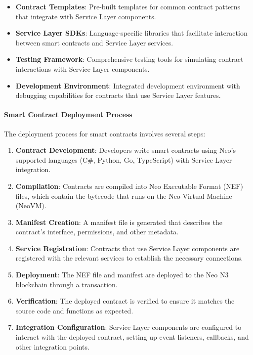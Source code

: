 \begin{itemize}
    \item \textbf{Contract Templates}: Pre-built templates for common contract patterns that integrate with Service Layer components.
    
    \item \textbf{Service Layer SDKs}: Language-specific libraries that facilitate interaction between smart contracts and Service Layer services.
    
    \item \textbf{Testing Framework}: Comprehensive testing tools for simulating contract interactions with Service Layer components.
    
    \item \textbf{Development Environment}: Integrated development environment with debugging capabilities for contracts that use Service Layer features.
\end{itemize}

\paragraph{Smart Contract Deployment Process}
The deployment process for smart contracts involves several steps:

\begin{enumerate}
    \item \textbf{Contract Development}: Developers write smart contracts using Neo's supported languages (C\#, Python, Go, TypeScript) with Service Layer integration.
    
    \item \textbf{Compilation}: Contracts are compiled into Neo Executable Format (NEF) files, which contain the bytecode that runs on the Neo Virtual Machine (NeoVM).
    
    \item \textbf{Manifest Creation}: A manifest file is generated that describes the contract's interface, permissions, and other metadata.
    
    \item \textbf{Service Registration}: Contracts that use Service Layer components are registered with the relevant services to establish the necessary connections.
    
    \item \textbf{Deployment}: The NEF file and manifest are deployed to the Neo N3 blockchain through a transaction.
    
    \item \textbf{Verification}: The deployed contract is verified to ensure it matches the source code and functions as expected.
    
    \item \textbf{Integration Configuration}: Service Layer components are configured to interact with the deployed contract, setting up event listeners, callbacks, and other integration points.
\end{enumerate}

